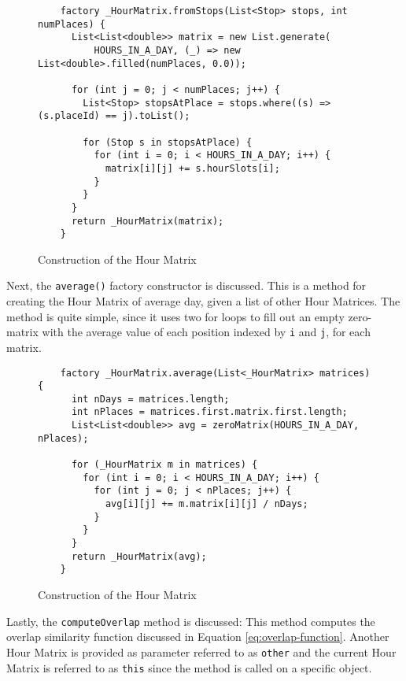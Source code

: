 \begin{figure}
    \centering
    \begin{verbatim}
    factory _HourMatrix.fromStops(List<Stop> stops, int numPlaces) {
      List<List<double>> matrix = new List.generate(
          HOURS_IN_A_DAY, (_) => new List<double>.filled(numPlaces, 0.0));
    
      for (int j = 0; j < numPlaces; j++) {
        List<Stop> stopsAtPlace = stops.where((s) => (s.placeId) == j).toList();
    
        for (Stop s in stopsAtPlace) {
          for (int i = 0; i < HOURS_IN_A_DAY; i++) {
            matrix[i][j] += s.hourSlots[i];
          }
        }
      }
      return _HourMatrix(matrix);
    }
    \end{verbatim}
    \caption{Construction of the Hour Matrix}
    \label{fig:hour-matrix-construction}
\end{figure}

Next, the \verb|average()| factory constructor is discussed. This is a method for creating the Hour Matrix of average day, given a list of other Hour Matrices. The method is quite simple, since it uses two for loops to fill out an empty zero-matrix with the average value of each position indexed by \verb|i| and \verb|j|, for each matrix.

\begin{figure}
    \centering
    \begin{verbatim}
    factory _HourMatrix.average(List<_HourMatrix> matrices) {
      int nDays = matrices.length;
      int nPlaces = matrices.first.matrix.first.length;
      List<List<double>> avg = zeroMatrix(HOURS_IN_A_DAY, nPlaces);
    
      for (_HourMatrix m in matrices) {
        for (int i = 0; i < HOURS_IN_A_DAY; i++) {
          for (int j = 0; j < nPlaces; j++) {
            avg[i][j] += m.matrix[i][j] / nDays;
          }
        }
      }
      return _HourMatrix(avg);
    }
    \end{verbatim}
    \caption{Construction of the Hour Matrix}
    \label{fig:hour-matrix-average}
\end{figure}

Lastly, the \verb|computeOverlap| method is discussed: This method computes the overlap similarity function discussed in Equation \ref{eq:overlap-function}. Another Hour Matrix is provided as parameter referred to as \verb|other| and the current Hour Matrix is referred to as \verb|this| since the method is called on a specific object. 


